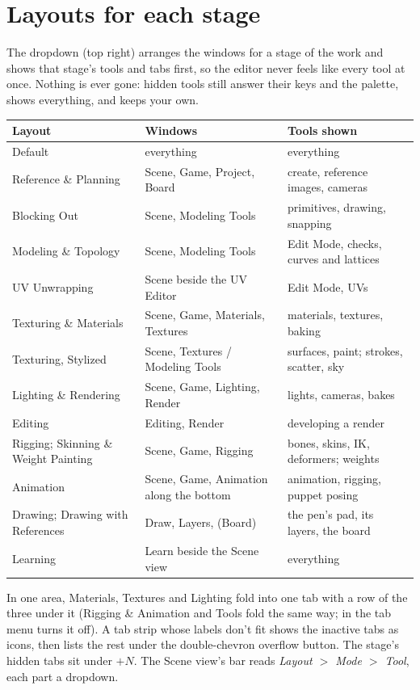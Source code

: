 \section{Layouts for each stage}
The  dropdown (top right) arranges the windows for a stage of the work and shows that stage's tools and tabs
first, so the editor never feels like every tool at once. Nothing is ever gone: hidden tools still answer their keys and
the palette,  shows everything, and  keeps your own.

\begin{center}
\begin{tabularx}{\textwidth}{lXX}
\toprule
Layout & Windows & Tools shown \\
\midrule
Default & everything & everything \\
Reference \& Planning & Scene, Game, Project, Board & create, reference images, cameras \\
Blocking Out & Scene, Modeling Tools & primitives, drawing, snapping \\
Modeling \& Topology & Scene, Modeling Tools & Edit Mode, checks, curves and lattices \\
UV Unwrapping & Scene beside the UV Editor & Edit Mode, UVs \\
Texturing \& Materials & Scene, Game, Materials, Textures & materials, textures, baking \\
Texturing, Stylized & Scene, Textures / Modeling Tools & surfaces, paint; strokes, scatter, sky \\
Lighting \& Rendering & Scene, Game, Lighting, Render & lights, cameras, bakes \\
Editing & Editing, Render & developing a render \\
Rigging; Skinning \& Weight Painting & Scene, Game, Rigging & bones, skins, IK, deformers; weights \\
Animation & Scene, Game, Animation along the bottom & animation, rigging, puppet posing \\
Drawing; Drawing with References & Draw, Layers, (Board) & the pen's pad, its layers, the board \\
Learning & Learn beside the Scene view & everything \\
\bottomrule
\end{tabularx}
\end{center}

In one area, Materials, Textures and Lighting fold into one  tab with a row of the three under it (Rigging
\& Animation and Tools fold the same way;  in the tab menu turns it off). A tab strip whose labels don't
fit shows the inactive tabs as icons, then lists the rest under the double-chevron overflow button. The stage's hidden tabs sit under $+N$. The
Scene view's bar reads \emph{Layout $>$ Mode $>$ Tool}, each part a dropdown.

